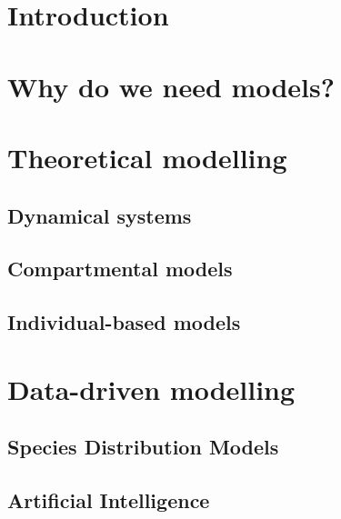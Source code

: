 \section{\label{sec:Introduction_2} Introduction}

\section{\label{sec:Why do we need models?} Why do we need models?}

\section{\label{sec:Theoretical modelling} Theoretical modelling}

\subsection{\label{sec:Dynamical systems} Dynamical systems}

\subsection{\label{sec:Compartmental models} Compartmental
  models}

\subsection{\label{sec:Individual-based models} Individual-based models}

\section{\label{sec:Data-driven modelling} Data-driven modelling}

\subsection{\label{sec:Species Distribution Models} Species Distribution
  Models}

\subsection{\label{sec:Artificial Intelligence} Artificial Intelligence}
